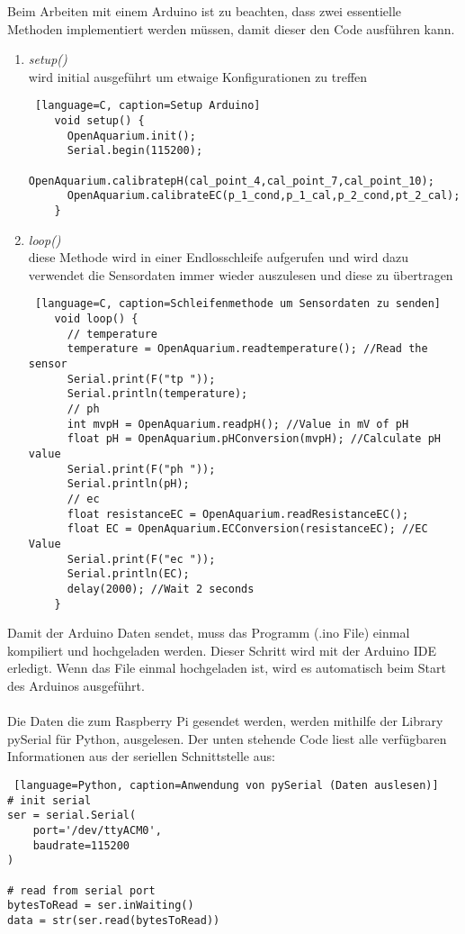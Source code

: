 \newpage
{}
Beim Arbeiten mit einem Arduino ist zu beachten, dass zwei essentielle Methoden implementiert werden müssen, damit dieser den Code ausführen kann. 
\begin{enumerate}
    \item \textit{setup()} \\
    wird initial ausgeführt um etwaige Konfigurationen zu treffen
    \begin{lstlisting} [language=C, caption=Setup Arduino]
    void setup() {
      OpenAquarium.init();
      Serial.begin(115200);
      OpenAquarium.calibratepH(cal_point_4,cal_point_7,cal_point_10);
      OpenAquarium.calibrateEC(p_1_cond,p_1_cal,p_2_cond,pt_2_cal);
    }
    \end{lstlisting}
    \item \textit{loop()} \\
    diese Methode wird in einer Endlosschleife aufgerufen und wird dazu verwendet die Sensordaten immer wieder auszulesen und diese zu übertragen
    \begin{lstlisting} [language=C, caption=Schleifenmethode um Sensordaten zu senden]
    void loop() {
      // temperature
      temperature = OpenAquarium.readtemperature(); //Read the sensor
      Serial.print(F("tp "));
      Serial.println(temperature);
      // ph
      int mvpH = OpenAquarium.readpH(); //Value in mV of pH
      float pH = OpenAquarium.pHConversion(mvpH); //Calculate pH value
      Serial.print(F("ph "));
      Serial.println(pH);
      // ec
      float resistanceEC = OpenAquarium.readResistanceEC();
      float EC = OpenAquarium.ECConversion(resistanceEC); //EC Value
      Serial.print(F("ec "));
      Serial.println(EC);
      delay(2000); //Wait 2 seconds
    }
    \end{lstlisting}
\end{enumerate}
\newpage
{}
Damit der Arduino Daten sendet, muss das Programm (.ino File) einmal kompiliert und hochgeladen werden. Dieser Schritt wird mit der Arduino IDE erledigt. Wenn das File einmal hochgeladen ist, wird es automatisch beim Start des Arduinos ausgeführt. \\ \mbox{} \\
Die Daten die zum Raspberry Pi gesendet werden, werden mithilfe der Library pySerial für Python, ausgelesen. Der unten stehende Code liest alle verfügbaren Informationen aus der seriellen Schnittstelle aus:
\begin{lstlisting} [language=Python, caption=Anwendung von pySerial (Daten auslesen)]
# init serial
ser = serial.Serial(
    port='/dev/ttyACM0',
    baudrate=115200
)

# read from serial port
bytesToRead = ser.inWaiting()
data = str(ser.read(bytesToRead))
\end{lstlisting}
